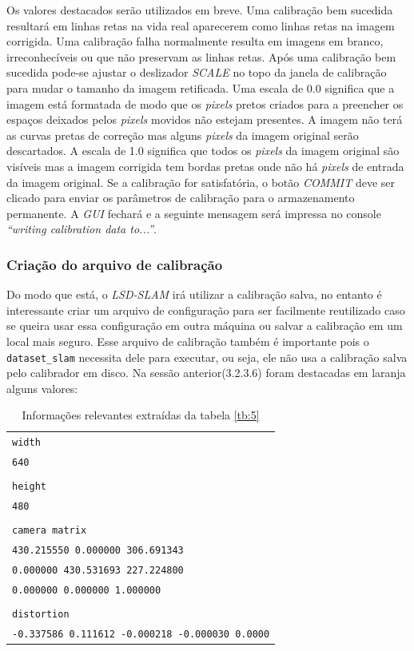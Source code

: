 

 
Os valores destacados serão utilizados em breve. Uma calibração bem sucedida resultará em linhas retas na vida real aparecerem como linhas retas na imagem corrigida. Uma calibração falha normalmente resulta em imagens em branco, irreconhecíveis ou que não preservam as linhas retas.
Após uma calibração bem sucedida pode-se ajustar o deslizador \textit{SCALE} no topo da janela de calibração para mudar o tamanho da imagem retificada. Uma escala de 0.0 significa que a imagem está formatada de modo que os \textit{pixels} pretos criados para a preencher os espaços deixados pelos \textit{pixels} movidos não estejam presentes. A imagem não terá as curvas pretas de correção mas alguns \textit{pixels} da imagem original serão descartados. A escala de 1.0 significa que todos os \textit{pixels} da imagem original são visíveis mas a imagem corrigida tem bordas pretas onde não há \textit{pixels} de entrada da imagem original.
Se a calibração for satisfatória, o botão \textit{COMMIT} deve ser clicado para enviar os parâmetros de calibração para o armazenamento permanente. A \textit{GUI} fechará e a seguinte mensagem será impressa no console \textit{“writing calibration data to...”}.

\subsubsection{Criação do arquivo de calibração}

Do modo que está, o \textit{LSD-SLAM} irá utilizar a calibração salva, no entanto é interessante criar um arquivo de configuração para ser facilmente reutilizado caso se queira usar essa configuração em outra máquina ou salvar a calibração em um local mais seguro. Esse arquivo de calibração também é importante pois o \texttt{dataset\_slam} necessita dele para executar, ou seja, ele não usa a calibração salva pelo calibrador em disco. Na sessão anterior(3.2.3.6) foram destacadas em laranja alguns valores:

\begin{table}[!ht]\label{tb:6}
\begin{tabular}{| p{\textwidth}|}
\hline\texttt{width}\\
\texttt{640}\\
\\
\texttt{height}\\
\texttt{480}\\
\\
\texttt{camera matrix}\\
\texttt{430.215550 0.000000 306.691343}\\
\texttt{0.000000 430.531693 227.224800}\\
\texttt{0.000000 0.000000 1.000000}\\
\\
\texttt{distortion}\\
\texttt{-0.337586 0.111612 -0.000218 -0.000030 0.0000}\\
\hline
\end{tabular}
\caption{Informações relevantes extraídas da tabela \ref{tb:5}}
\end{table}


